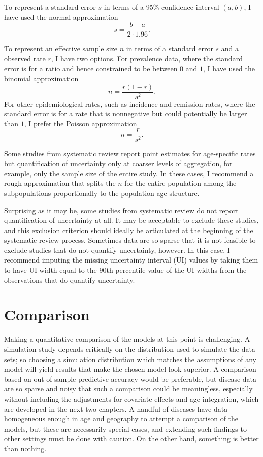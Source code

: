 To represent a standard error $s$ in terms of a 95\% confidence
interval $(a,b)$, I have used the normal approximation
\[
s = \frac{b-a}{2\cdot 1.96}.
\]

To represent an effective sample size $n$ in terms of a standard error
$s$ and a observed rate $r$, I have two options.  For prevalence data,
where the standard error is for a ratio and hence constrained to be
between $0$ and $1$, I have used the binomial approximation
\[
n = \frac{r(1-r)}{s^2}.
\]
For other epidemiological rates, such as incidence and remission
rates, where the standard error is for a rate that is nonnegative but
could potentially be larger than $1$, I prefer the Poisson
approximation
\[
n = \frac{r}{s^2}.
\]

Some studies from systematic review report point estimates for
age-specific rates but quantification of uncertainty only at coarser
levels of aggregation, for example, only the sample size of the entire
study.  In these cases, I recommend a rough approximation that splits
the $n$ for the entire population among the subpopulations
proportionally to the population age structure.

Surprising as it may be, some studies from systematic review do not
report quantification of uncertainty at all.  It may be acceptable
to exclude these studies, and this exclusion criterion should ideally
be articulated at the beginning of the systematic review process.
Sometimes data are so sparse that it is not feasible to exclude studies
that do not quantify uncertainty, however.  In this case, I recommend
imputing the missing uncertainty interval (UI) values by taking them to have UI width equal to the $90$th
percentile value of the UI widths from the observations that do quantify
uncertainty.



\section{Comparison}
Making a quantitative comparison of the models at this point is
challenging.  A simulation study depends critically on the
distribution used to simulate the data sets; so choosing a simulation
distribution which matches the assumptions of any model will yield
results that make the chosen model look superior. A comparison based
on out-of-sample predictive accuracy would be preferable, but disease
data are so sparse and noisy that such a comparison could be
meaningless, especially without including the adjustments for
covariate effects and age integration, which are developed in the next
two chapters.  A handful of diseases have data homogeneous enough in
age and geography to attempt a comparison of the models, but these are
necessarily special cases, and extending such findings to other
settings must be done with caution.  On the other hand, something is
better than nothing.

